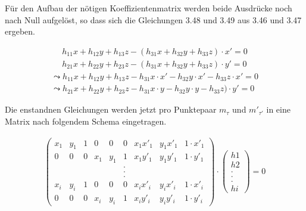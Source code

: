 Für den Aufbau der nötigen Koeffizientenmatrix werden beide Ausdrücke noch nach Null aufgelöst, so dass sich die Gleichungen 3.48 und 3.49 aus 3.46 und 3.47 ergeben.

\begin{gather}
	h_{11}x+h_{12}y+h_{13}z -(h_{31}x+h_{32}y+h_{33}z) \cdot x'= 0 \\	h_{21}x+h_{22}y+h_{23}z-(h_{31}x+h_{32}y+h_{33}z) \cdot y'=0
	\end{gather}
\begin{gather}
	\leadsto h_{11}x+h_{12}y+h_{13}z -h_{31}x\cdot x' - h_{32}y \cdot x'-h_{33}z\cdot x'= 0\\
	\leadsto h_{21}x+h_{22}y+h_{23}z-h_{31}x\cdot y -h_{32}y \cdot y -h_{33}z) \cdot y'=0
\end{gather}

Die enstandnen Gleichungen werden jetzt pro Punktepaar $m_\tau$ und $m'_{\tau'}$ in eine Matrix nach folgendem Schema eingetragen.\cite{Elements,HZ,Schwarz,Heipke}

\begin{gather}
	\begin{pmatrix}
	x_1&y_1&1&0&0&0&x_1 x'_1&y_1 x'_1 & 1\cdot x'_1\\
	0&0&0&x_1&y_1&1&x_1 y'_1&y_1 y'_1 & 1\cdot y'_1\\
	&&&&&.&&&\\	
	&&&&&.&&&\\	
	&&&&&.&&&\\	
	x_i&y_i&1&0&0&0&x_i x'_i&y_i x'_i & 1\cdot x'_i\\
	0&0&0&x_i&y_i&1&x_i y'_i&y_i y'_i & 1\cdot y'_i
	\end{pmatrix}
	\cdot
	\begin{pmatrix}
	h1\\h2\\.\\.\\.\\hi
	\end{pmatrix}
	=0
\end{gather}

